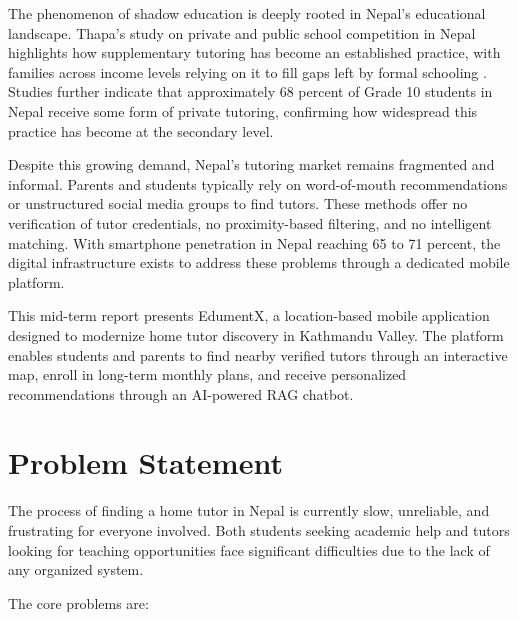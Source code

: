 \documentclass[12pt]{report}
\begin{document}
The phenomenon of shadow education is deeply rooted in Nepal's
educational landscape. Thapa's study on private and public
school competition in Nepal highlights how supplementary
tutoring has become an established practice, with families
across income levels relying on it to fill gaps left by formal
schooling \citep{Thapa2013Private}. Studies further indicate
that approximately 68 percent of Grade 10 students in Nepal
receive some form of private tutoring, confirming how
widespread this practice has become at the secondary level.

Despite this growing demand, Nepal's tutoring market remains
fragmented and informal. Parents and students typically rely on
word-of-mouth recommendations or unstructured social media
groups to find tutors. These methods offer no verification of
tutor credentials, no proximity-based filtering, and no
intelligent matching. With smartphone penetration in Nepal
reaching 65 to 71 percent, the digital infrastructure exists to
address these problems through a dedicated mobile platform.

This mid-term report presents EdumentX, a location-based
mobile application designed to modernize home tutor discovery
in Kathmandu Valley. The platform enables students and parents
to find nearby verified tutors through an interactive map,
enroll in long-term monthly plans, and receive personalized
recommendations through an AI-powered RAG chatbot.

\section{Problem Statement}

The process of finding a home tutor in Nepal is currently slow,
unreliable, and frustrating for everyone involved. Both students
seeking academic help and tutors looking for teaching
opportunities face significant difficulties due to the lack of
any organized system.

The core problems are:
\end{document}
